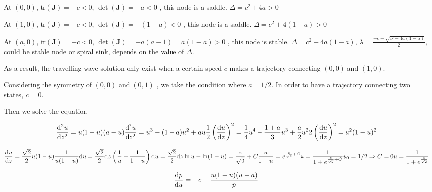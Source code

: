 \documentclass[
]{article}
\begin{document}
At $(0,0)$, $\mathrm{tr}(\mathbf{J})=-c<0$,
$\det(\mathbf{J}) = -a<0$ , this node is a saddle.
$\Delta = c^2 + 4a >0$

At $(1,0)$, $\mathrm{tr}(\mathbf{J})=-c<0$,
$\det(\mathbf{J}) = -(1-a)<0$ , this node is a saddle.
$\Delta = c^2 + 4(1-a)>0$

At $(a,0)$, $\mathrm{tr}(\mathbf{J})=-c<0$,
$\det(\mathbf{J}) = -a(a-1) = a(1-a)>0$ , this node is stable.
$\Delta = c^2 - 4a(1-a)$,
$\lambda = \frac{-c \pm \sqrt{c^2 - 4a(1-a)}}{2}$, could be stable
node or spiral sink, depends on the value of $\Delta$.

As a result, the travelling wave solution only exist when a certain
speed $c$ makes a trajectory connecting $(0,0)$ and $(1,0)$.

Considering the symmetry of $(0,0)$ and $(0,1)$ , we take the
condition where $a= 1/2$. In order to have a trajectory connecting two
states, $c=0$.

Then we solve the equation

\begin{equation*}
\frac{\mathrm{d}^2 u}{\mathrm{d} z^2} = u(1-u)(a-u)\\
\frac{\mathrm{d}^2 u}{\mathrm{d} z^2} = u^3 -(1+a)u^2 + au\\
\frac{1}{2}\left(\frac{\mathrm{d} u}{\mathrm{d} z}\right)^2 
= \frac{1}{4}u^4 - \frac{1+a}{3}u^3 + \frac{a}{2}u^2\\
2\left(\frac{\mathrm{d} u}{\mathrm{d} z}\right)^2 
= u^2(1-u)^2 \\
\end{equation*}

\begin{equation*}
\frac{\mathrm{d} u}{\mathrm{d} z} = \frac{\sqrt{2}}{2} u(1-u) \\
\frac{1}{u(1-u)}\mathrm{d} u = \frac{\sqrt{2}}{2}\mathrm{d} z\\
\left(\frac{1}{u} + \frac{1}{1-u}\right)\mathrm{d} u = \frac{\sqrt{2}}{2}\mathrm{d} z\\
\ln{u} - \ln(1-u) = \frac{z}{\sqrt{2}}+C\\
\frac{u}{1-u} = e^{\frac{z}{\sqrt{2}}+C}\\
u = \frac{1}{1+e^{\frac{z}{\sqrt{2}}+C}}\\
u_{0} = 1/2 \Rightarrow C = 0\\
u = \frac{1}{1+e^{\frac{z}{\sqrt{2}}}}
\end{equation*}

\begin{equation*}
\frac{\mathrm{d}p} {\mathrm{d}u} = -c - \frac{u(1-u)(u-a)}{p}\\
\end{equation*}
\end{document}
